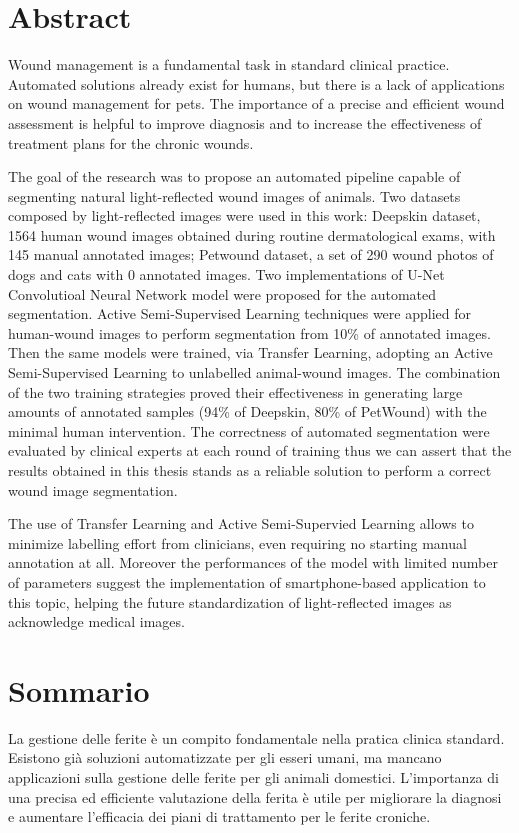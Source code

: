 \documentclass[../main.tex]{subfiles}
\begin{document}
\section*{Abstract}
 Wound management is a fundamental task in standard clinical practice. Automated solutions already exist for humans, but there is a lack of applications on wound management for pets.
 The importance of a precise and efficient wound assessment is helpful to improve diagnosis and to increase the effectiveness of treatment plans for the chronic wounds.

The goal of the research was to propose an automated pipeline capable of segmenting natural light-reflected wound images of animals.
Two datasets composed by light-reflected images were used in this work: Deepskin dataset, 1564 human wound images obtained during routine dermatological exams, with 145 manual annotated images; Petwound dataset, a set of 290 wound photos of dogs and cats with 0 annotated images.
Two implementations of U-Net Convolutioal Neural Network model were proposed for the automated segmentation.
Active Semi-Supervised Learning techniques were applied for human-wound images to perform segmentation from 10\% of annotated images. Then the same models were trained, via Transfer Learning, adopting an Active Semi-Supervised Learning to unlabelled animal-wound images.
The combination of the two training strategies proved their
effectiveness in generating large amounts of annotated samples (94\% of Deepskin, 80\% of PetWound) with the minimal human intervention.
The correctness of automated segmentation were evaluated by clinical experts at each round of training thus we can assert that the results obtained in this thesis stands as a reliable solution to perform a correct wound image segmentation.

The use of Transfer Learning and Active Semi-Supervied Learning allows to minimize labelling effort from clinicians, even requiring no starting manual annotation at all. Moreover the performances of the model with limited number of parameters suggest the implementation of smartphone-based application to this topic, helping the future standardization of light-reflected images as acknowledge medical images.


\newpage
\section*{Sommario}
La gestione delle ferite è un compito fondamentale nella pratica clinica standard. Esistono già soluzioni automatizzate per gli esseri umani, ma mancano applicazioni sulla gestione delle ferite per gli animali domestici.
 L'importanza di una precisa ed efficiente valutazione della ferita  è utile per migliorare la diagnosi e aumentare l'efficacia dei piani di trattamento per le ferite croniche.
 
\end{document}

